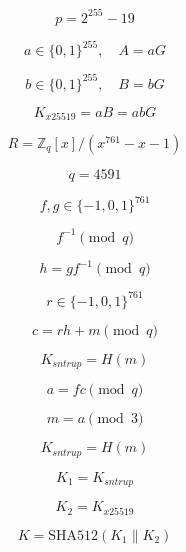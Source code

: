 \documentclass{article}
\begin{document}
\[
p = 2^{255} - 19
\]

\[
a \in \{0,1\}^{255}, \quad A = aG
\]

\[
b \in \{0,1\}^{255}, \quad B = bG
\]

\[
K_{x25519} = aB = abG
\]

\[
R = \mathbb{Z}_q[x] / (x^{761} - x - 1)
\]

\[
q = 4591
\]

\[
f, g \in \{-1,0,1\}^{761}
\]

\[
f^{-1} \pmod q
\]

\[
h = g f^{-1} \pmod q
\]

\[
r \in \{-1,0,1\}^{761}
\]

\[
c = r h + m \pmod q
\]

\[
K_{sntrup} = H(m)
\]

\[
a = f c \pmod q
\]

\[
m = a \pmod 3
\]

\[
K_{sntrup} = H(m)
\]

\[
K_1 = K_{sntrup}
\]

\[
K_2 = K_{x25519}
\]

\[
K = \mathrm{SHA512}(K_1 \parallel K_2)
\]
\end{document}

